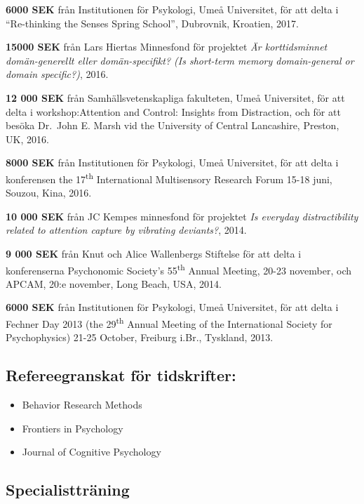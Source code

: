 \documentclass[]{article}
\begin{document}
\textbf{6000 SEK} från Institutionen för Psykologi, Umeå Universitet,
för att delta i ``Re-thinking the Senses Spring School'', Dubrovnik,
Kroatien, 2017.

\textbf{15000 SEK} från Lars Hiertas Minnesfond för projektet \emph{Är
korttidsminnet domän-generellt eller domän-specifikt? (Is short-term
memory domain-general or domain specific?)}, 2016.

\textbf{12 000 SEK} från Samhällsvetenskapliga fakulteten, Umeå
Universitet, för att delta i workshop:Attention and Control: Insights
from Distraction, och för att besöka Dr.~John E. Marsh vid the
University of Central Lancashire, Preston, UK, 2016.

\textbf{8000 SEK} från Institutionen för Psykologi, Umeå Universitet,
för att delta i konferensen the 17\textsuperscript{th} International
Multisensory Research Forum 15-18 juni, Souzou, Kina, 2016.

\textbf{10 000 SEK} från JC Kempes minnesfond för projektet \emph{Is
everyday distractibility related to attention capture by vibrating
deviants?}, 2014.

\textbf{9 000 SEK} från Knut och Alice Wallenbergs Stiftelse för att
delta i konferenserna Psychonomic Society's 55\textsuperscript{th}
Annual Meeting, 20-23 november, och APCAM, 20:e november, Long Beach,
USA, 2014.

\textbf{6000 SEK} från Institutionen för Psykologi, Umeå Universitet,
för att delta i Fechner Day 2013 (the 29\textsuperscript{th} Annual
Meeting of the International Society for Psychophysics) 21-25 October,
Freiburg i.Br., Tyskland, 2013.

\hypertarget{refereegranskat-fuxf6r-tidskrifter}{%
\subsection{Refereegranskat för
tidskrifter:}\label{refereegranskat-fuxf6r-tidskrifter}}

\begin{itemize}
\item
  Behavior Research Methods
\item
  Frontiers in Psychology
\item
  Journal of Cognitive Psychology
\end{itemize}

\hypertarget{specialisttruxe4ning}{%
\subsection{Specialistträning}\label{specialisttruxe4ning}}
\end{document}
